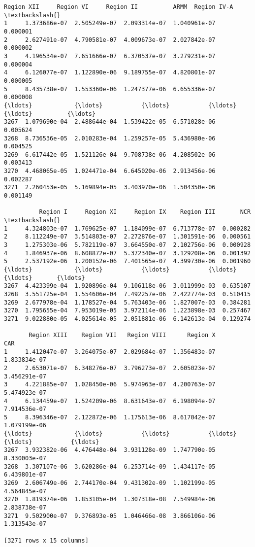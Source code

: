 \documentclass[11pt]{article}
\makeatletter
\newcommand{\boxspacing}{\kern\kvtcb@left@rule\kern\kvtcb@boxsep}
\newcommand{\prompt}[4]{
        {\ttfamily\llap{{\color{#2}[#3]:\hspace{3pt}#4}}\vspace{-\baselineskip}}
    }
\makeatother
\begin{document}
            \begin{tcolorbox}[breakable, size=fbox, boxrule=.5pt, pad at break*=1mm, opacityfill=0]
\prompt{Out}{outcolor}{77}{\boxspacing}
\begin{Verbatim}[commandchars=\\\{\}]
        Region XII     Region VI     Region II          ARMM  Region IV-A  \textbackslash{}
1     1.373686e-07  2.505249e-07  2.093314e-07  1.040961e-07     0.000001
2     2.627491e-07  4.790581e-07  4.009673e-07  2.027842e-07     0.000002
3     4.196534e-07  7.651666e-07  6.370537e-07  3.279231e-07     0.000004
4     6.126077e-07  1.122890e-06  9.189755e-07  4.820801e-07     0.000005
5     8.435738e-07  1.553360e-06  1.247377e-06  6.655336e-07     0.000008
{\ldots}            {\ldots}           {\ldots}           {\ldots}           {\ldots}          {\ldots}
3267  1.079690e-04  2.488644e-04  1.539422e-05  6.571028e-06     0.005624
3268  8.736536e-05  2.010283e-04  1.259257e-05  5.436980e-06     0.004525
3269  6.617442e-05  1.521126e-04  9.708738e-06  4.208502e-06     0.003413
3270  4.468065e-05  1.024471e-04  6.645020e-06  2.913456e-06     0.002287
3271  2.260453e-05  5.169894e-05  3.403970e-06  1.504350e-06     0.001149

          Region I     Region XI     Region IX    Region III       NCR  \textbackslash{}
1     4.324803e-07  1.769625e-07  1.184099e-07  6.713778e-07  0.000282
2     8.112249e-07  3.514803e-07  2.272876e-07  1.301591e-06  0.000561
3     1.275303e-06  5.782119e-07  3.664550e-07  2.102756e-06  0.000928
4     1.846937e-06  8.608872e-07  5.372340e-07  3.129208e-06  0.001392
5     2.537192e-06  1.200152e-06  7.401565e-07  4.399730e-06  0.001960
{\ldots}            {\ldots}           {\ldots}           {\ldots}           {\ldots}       {\ldots}
3267  4.423399e-04  1.920896e-04  9.106118e-06  3.011999e-03  0.635107
3268  3.551725e-04  1.554606e-04  7.492257e-06  2.422774e-03  0.510415
3269  2.677978e-04  1.178527e-04  5.763403e-06  1.827007e-03  0.384281
3270  1.795655e-04  7.953019e-05  3.972114e-06  1.223898e-03  0.257467
3271  9.022880e-05  4.025614e-05  2.051881e-06  6.142613e-04  0.129274

       Region XIII    Region VII   Region VIII      Region X           CAR
1     1.412047e-07  3.264075e-07  2.029684e-07  1.356483e-07  1.833834e-07
2     2.653071e-07  6.348276e-07  3.796273e-07  2.605023e-07  3.456291e-07
3     4.221885e-07  1.028450e-06  5.974963e-07  4.200763e-07  5.474923e-07
4     6.134459e-07  1.524209e-06  8.631643e-07  6.198094e-07  7.914536e-07
5     8.396346e-07  2.122872e-06  1.175613e-06  8.617042e-07  1.079199e-06
{\ldots}            {\ldots}           {\ldots}           {\ldots}           {\ldots}           {\ldots}
3267  3.932382e-06  4.476448e-04  3.931128e-09  1.747790e-05  8.330003e-07
3268  3.307107e-06  3.620286e-04  6.253714e-09  1.434117e-05  6.439801e-07
3269  2.606749e-06  2.744170e-04  9.431302e-09  1.102199e-05  4.564845e-07
3270  1.819374e-06  1.853105e-04  1.307318e-08  7.549984e-06  2.838738e-07
3271  9.502900e-07  9.376893e-05  1.046466e-08  3.866106e-06  1.313543e-07

[3271 rows x 15 columns]
\end{Verbatim}
\end{tcolorbox}
        
\end{document}
